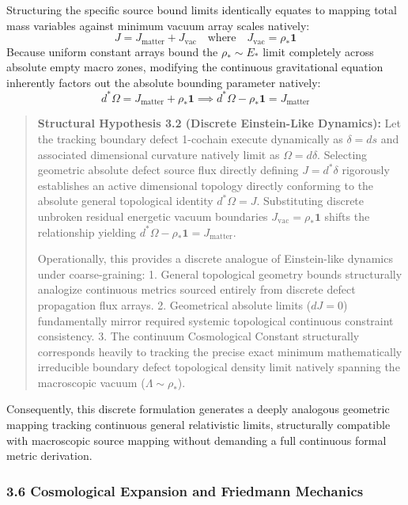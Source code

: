 \documentclass[
]{article}
\begin{document}
Structuring the specific source bound limits identically equates to
mapping total mass variables against minimum vacuum array scales
natively:
\[ J = J_{\text{matter}} + J_{\text{vac}} \quad \text{where} \quad J_{\text{vac}} = \rho_* \mathbf{1} \]
Because uniform constant arrays bound the \(\rho_* \sim E_*\) limit
completely across absolute empty macro zones, modifying the continuous
gravitational equation inherently factors out the absolute bounding
parameter natively:
\[ d^*\Omega = J_{\text{matter}} + \rho_* \mathbf{1} \implies d^*\Omega - \rho_* \mathbf{1} = J_{\text{matter}} \]

\begin{quote}
\textbf{Structural Hypothesis 3.2 (Discrete Einstein-Like Dynamics):}
Let the tracking boundary defect 1-cochain execute dynamically as
\(\delta = ds\) and associated dimensional curvature natively limit as
\(\Omega = d\delta\). Selecting geometric absolute defect source flux
directly defining \(J = d^*\delta\) rigorously establishes an active
dimensional topology directly conforming to the absolute general
topological identity \(d^*\Omega = J\). Substituting discrete unbroken
residual energetic vacuum boundaries
\(J_{\text{vac}} = \rho_* \mathbf{1}\) shifts the relationship yielding
\(d^*\Omega - \rho_* \mathbf{1} = J_{\text{matter}}\).

Operationally, this provides a discrete analogue of Einstein-like
dynamics under coarse-graining: 1. General topological geometry bounds
structurally analogize continuous metrics sourced entirely from discrete
defect propagation flux arrays. 2. Geometrical absolute limits
(\(dJ = 0\)) fundamentally mirror required systemic topological
continuous constraint consistency. 3. The continuum Cosmological
Constant structurally corresponds heavily to tracking the precise exact
minimum mathematically irreducible boundary defect topological density
limit natively spanning the macroscopic vacuum
(\(\Lambda \sim \rho_*\)).
\end{quote}

Consequently, this discrete formulation generates a deeply analogous
geometric mapping tracking continuous general relativistic limits,
structurally compatible with macroscopic source mapping without
demanding a full continuous formal metric derivation.

\subsubsection{3.6 Cosmological Expansion and Friedmann
Mechanics}\label{cosmological-expansion-and-friedmann-mechanics}
\end{document}
